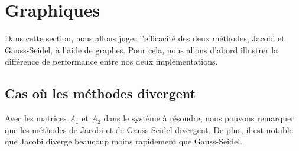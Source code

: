 




% 

\newpage
\section{Graphiques}
Dans cette section, nous allons juger l'efficacité des deux méthodes, Jacobi et Gauss-Seidel, à l'aide de graphes. Pour cela, nous allons d'abord illustrer la différence de performance entre nos deux implémentations.
\subsection{Cas où les méthodes divergent}
Avec les matrices $A_1$ et $A_2$ dans le système à résoudre, nous pouvons remarquer que les méthodes de Jacobi et de Gauss-Seidel divergent. De plus, il est notable que Jacobi diverge beaucoup moins rapidement que Gauss-Seidel.

